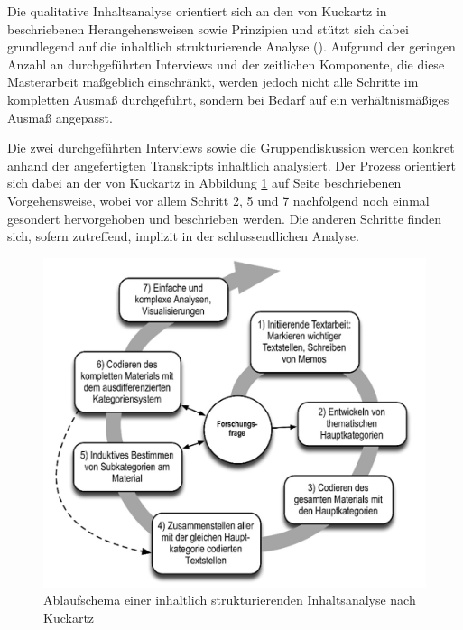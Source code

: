 \documentclass[a4paper,12pt,twoside,numbers=noendperiod]{scrreprt}
\begin{document}
Die qualitative Inhaltsanalyse orientiert sich an den von Kuckartz in \cite{kuckartz_qualitative_2018} beschriebenen Herangehensweisen sowie Prinzipien und stützt sich dabei grundlegend auf die inhaltlich strukturierende Analyse (\cite[97-122]{kuckartz_qualitative_2018}). Aufgrund der geringen Anzahl an durchgeführten Interviews und der zeitlichen Komponente, die diese Masterarbeit maßgeblich einschränkt, werden jedoch nicht alle Schritte im kompletten Ausmaß durchgeführt, sondern bei Bedarf auf ein verhältnismäßiges Ausmaß angepasst.

\medskip

Die zwei durchgeführten Interviews sowie die Gruppendiskussion werden konkret anhand der angefertigten Transkripts inhaltlich analysiert. Der Prozess orientiert sich dabei an der von Kuckartz in Abbildung \ref{fig:ablaufschema-inhaltlich-strukturierende-inhaltsanalyse} auf Seite \pageref{fig:ablaufschema-inhaltlich-strukturierende-inhaltsanalyse} beschriebenen Vorgehensweise, wobei vor allem Schritt 2, 5 und 7 nachfolgend noch einmal gesondert hervorgehoben und beschrieben werden. Die anderen Schritte finden sich, sofern zutreffend, implizit in der schlussendlichen Analyse.

\begin{figure}[ht]
    \centering
    \includegraphics[width=.8\linewidth]{thesis/images/Kuckartz_Ablaufschema-inhaltlich-strukturierenden-Inhaltsanalyse.png}
    \caption[Ablaufschema einer inhaltlich strukturierenden Inhaltsanalyse nach Kuckartz]{Ablaufschema einer inhaltlich strukturierenden Inhaltsanalyse nach Kuckartz \cite[100]{kuckartz_qualitative_2018}}
    \label{fig:ablaufschema-inhaltlich-strukturierende-inhaltsanalyse}
\end{figure}
\end{document}
